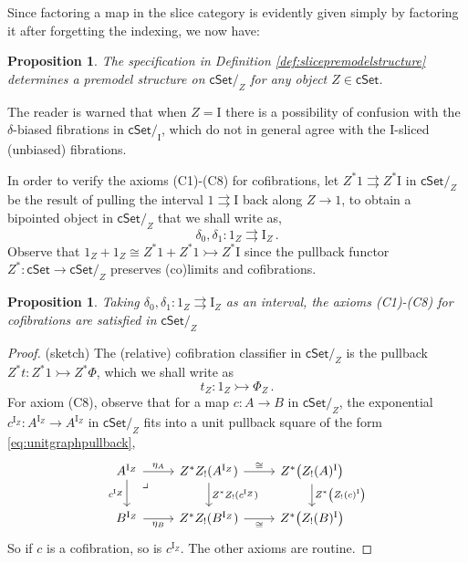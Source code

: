 \documentclass[11pt,reqno]{amsart}
\newcommand{\cSet}{\ensuremath{\mathsf{cSet}}}
\newcommand{\cSetZ}{\ensuremath{\mathsf{cSet}/_{\!Z}}}
\newcommand{\cof}{\ensuremath{\rightarrowtail}}
\renewcommand{\to}{\ensuremath{\rightarrow}}
\newcommand{\I}{\ensuremath{\mathrm{I}}}
\newtheorem{proposition}[theorem]{Proposition}
\theoremstyle{remark}
\theoremstyle{definition}
\newcommand{\pbmark}{\ar[dr, phantom, "\lrcorner" very near start, shift right=.5ex]}	%
\begin{document}
Since factoring a map in the slice category is evidently given simply by factoring it after forgetting the indexing, we now have:

\begin{proposition}\label{prop:slicepremodelstructure}
The specification in Definition \ref{def:slicepremodelstructure} determines a premodel structure on $\cSetZ$ for any object $Z \in \cSet$.
\end{proposition}

The reader is warned that when $Z = \I$ there is a possibility of confusion with the $\delta$-biased fibrations in $\cSet/_\I$, which do not in general agree with the $\I$-sliced (unbiased) fibrations.  

In order to verify the axioms (C1)-(C8) for cofibrations, let $Z^*1 \rightrightarrows Z^*\I$ in $\cSetZ$ be the result of pulling the interval $1 \rightrightarrows \I$ back along $Z\to 1$, to obtain a bipointed object in $\cSetZ$ that we shall write as,
\begin{equation}\label{eq:relativeinterval}
\delta_0, \delta_1 : 1_Z \rightrightarrows \I_Z\,.
\end{equation}
Observe that $1_Z + 1_Z \cong Z^*1 + Z^*1 \cof Z^*\I$ since the pullback functor  $Z^* : \cSet\to \cSetZ$ preserves (co)limits and cofibrations.   

\begin{proposition}
Taking $\delta_0, \delta_1 : 1_Z \rightrightarrows \I_Z$ as an interval, the axioms  (C1)-(C8) for cofibrations are satisfied in $\cSetZ$ 
\end{proposition}

\begin{proof}(sketch)
The (relative) cofibration classifier in $\cSetZ$ is the pullback $Z^*t : Z^*1 \cof Z^*\Phi$, which we shall write as
\begin{equation}\label{eq:relativecofclassifier}
t_Z : 1_Z \cof \Phi_Z\,.
\end{equation}
For axiom (C8), observe that for a map $c : A \to B$ in $\cSetZ$, the exponential $c^{\I_Z} : A^{\I_Z}  \to A^{\I_Z} $ in $\cSetZ$ fits into a unit pullback square of the form \eqref{eq:unitgraphpullback},
\begin{equation}\label{eq:unitgraphpullback2}
\begin{tikzcd}
A^{\I_Z}  \ar[d,swap, "c^{\I_Z}"] \ar[r, "\eta_A" ] \pbmark & Z^*Z_!(A^{\I_Z})   \ar[d, "Z^*Z_!(c^{\I_Z})"] \ar[r, "\cong"] 
	& Z^*\big(Z_!(A)^{\I} \big) \ar[d, "Z^*\big(Z_!(c)^{\I} \big)"] \\  
B^{\I_Z}   \ar[r, swap, "\eta_B" ]   & Z^*Z_!(B^{\I_Z})   \ar[r,swap, "\cong"] & Z^*\big(Z_!(B)^{\I} \big)
 \end{tikzcd}
 \end{equation}
So if $c$ is a cofibration, so is $c^{\I_Z}$.
The other axioms are routine.
\end{proof}
\end{document}
